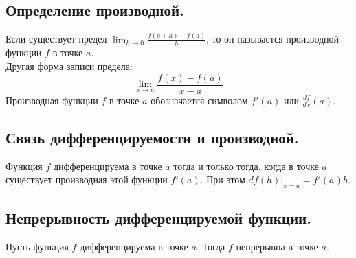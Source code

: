 

\label{sec_Definition06}
\begin{definition}
    \subsection*{Определение производной.}
    \begin{note}[purple]
        Если существует предел 
        $\displaystyle{\lim_{h \rightarrow 0}} \frac{f(a + h) - f(a)}{h}$, 
        то он называется производной функции $f$ в точке $a$. \\
        Другая форма записи предела:
        $$ \lim_{x \rightarrow a} \frac{f(x) - f(a)}{x - a} $$
        Производная функции $f$ в точке $a$ обозначается символом 
        $f'(a)$ или $\frac{df}{dx}(a)$. 
    \end{note}

    \subsection*{Связь дифференцируемости и производной.}
    \begin{note}[purple]
        Функция $f$ дифференцируема в точке $a$ тогда и только тогда, когда 
        в точке $a$ существует производная этой функции $f'(a)$. При этом 
        $df(h) | _{x = a} = f'(a)h$.
    \end{note}

    \subsection*{Непрерывность дифференцируемой функции.}
    \begin{note}[purple]
        Пусть функция $f$ дифференцируема в точке $a$. Тогда $f$ непрерывна в точке $a$. 
    \end{note}
\end{definition}